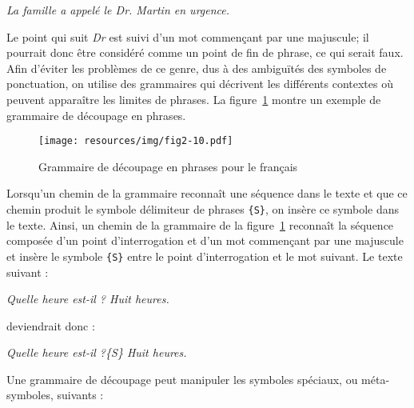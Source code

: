\bigskip
\textit{La famille a appelé le Dr. Martin en urgence.}

\bigskip \noindent Le point qui suit \textit{Dr} est suivi d’un mot commençant par une majuscule;
il pourrait donc être considéré comme un point de fin de phrase, ce qui serait faux. Afin d’éviter
les problèmes de ce genre, dus à des ambiguïtés des symboles de ponctuation, on utilise des
grammaires qui décrivent les différents contextes où peuvent apparaître les limites de phrases.
La figure~\ref{fig-example-sentence-splitting} montre un exemple de grammaire de découpage en
phrases.

\begin{figure}[!ht]
\begin{center}
\texttt{[image: resources/img/fig2-10.pdf]}
\caption{Grammaire de découpage en phrases pour le français
\label{fig-example-sentence-splitting}}
\end{center}
\end{figure}

\noindent  Lorsqu’un chemin de la grammaire reconnaît une séquence dans le texte et que ce chemin
produit le symbole délimiteur de phrases \verb+{S}+,
on insère ce symbole dans le texte. Ainsi,
un chemin de la grammaire de la figure~\ref{fig-example-sentence-splitting} reconnaît la séquence
composée d’un point d’interrogation et d’un mot commençant par une majuscule et insère le symbole 
\verb+{S}+ entre le point d’interrogation et le mot suivant. Le texte suivant :


\bigskip
\textit{Quelle heure est-il ? Huit heures.}

\bigskip
\noindent deviendrait donc :

\bigskip
\textit{Quelle heure est-il ?\{S\} Huit heures.}

\bigskip
\noindent Une grammaire de découpage peut manipuler les symboles spéciaux, ou méta-symboles, suivants :

